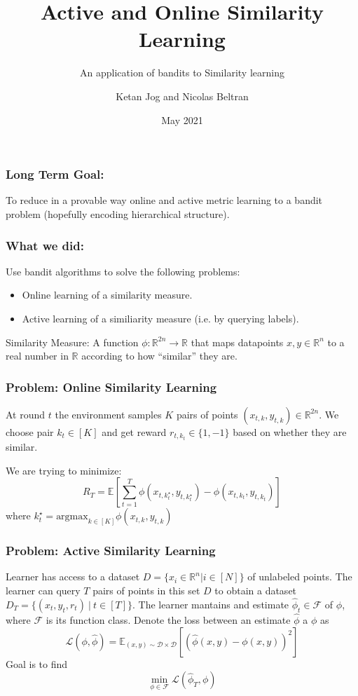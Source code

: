 \documentclass{beamer}
\title[Similarity Learning]{Active and Online Similarity Learning}
\subtitle[]{An application of bandits to Similarity learning}
\author[Ketan and Nicolas]{Ketan Jog and Nicolas Beltran}
\institute[]{Columbia University}
\date{May 2021}
\begin{document}
\begin{frame}
    \titlepage
\end{frame}


\begin{frame}
\frametitle{Long Term Goal:}
To reduce in a provable way online and active metric learning to a bandit problem (hopefully encoding hierarchical structure).
\end{frame}

\begin{frame}{}
\frametitle{What we did:}
Use bandit algorithms to solve the following problems:
\begin{itemize}
\item
    Online learning of a similarity measure.
\item
    Active learning of a similiarity measure (i.e. by querying labels).
\end{itemize}
\vspace*{1cm}
\begin{definition}
Similarity Measure: A function $\phi: \mathbb{R}^{2n} \to \mathbb{R}$ that maps datapoints $x, y \in \mathbb{R}^{n}$ to a real number in $\mathbb{R}$
according to how ``similar'' they are.
\end{definition}
\end{frame}


\begin{frame}{}
    \frametitle{Problem: Online Similarity Learning}
    At round $t$ the environment samples $K$ pairs of points $(x_{t,k}, y_{t,k}) \in \mathbb{R}^{2n}$.
    We choose pair $k_t \in [K]$ and get reward $r_{t,k_{t}} \in \{1, -1\}$ based on whether they are similar.

    We are trying to minimize:
    \[ R_T = \mathbb{E}\left[\sum_{t =1}^T \phi(x_{t,k^\star_t}, y_{t,k^\star_t}) - \phi(x_{t,k_t}, y_{t,k_t})\right]\]
    where $k_t^\star = \text{argmax}_{k\in [K]} \phi(x_{t,k}, y_{t,k})$
\end{frame}

\begin{frame}{}
    \frametitle{Problem: Active Similarity Learning}
    Learner has access to a dataset $D = \{x_i \in \mathbb{R}^n| i \in [N]\}$ of unlabeled points.
    The learner can query $T$ pairs of points in this set $D$ to obtain a dataset $D_T = \{(x_t, y_t, r_t) ~|  ~t \in [T]\}$.
    The learner mantains and estimate $\hat{\phi}_t \in \mathcal{F}$ of $\phi$, where $\mathcal{F}$ is its function class.
    Denote the loss between an estimate $\hat{\phi}$ a $\phi$ as
    \[ \mathcal{L}(\phi, \hat{\phi}) = \mathbb{E}_{(x, y) \sim \mathcal{D} \times \mathcal{D}}[(\hat{\phi}(x,y) - \phi(x, y))^2] \]
    Goal is to find
    \[\min_{\phi \in \mathcal{F}} \mathcal{L}(\hat{\phi}_T, \phi)\]

\end{frame}
\end{document}
